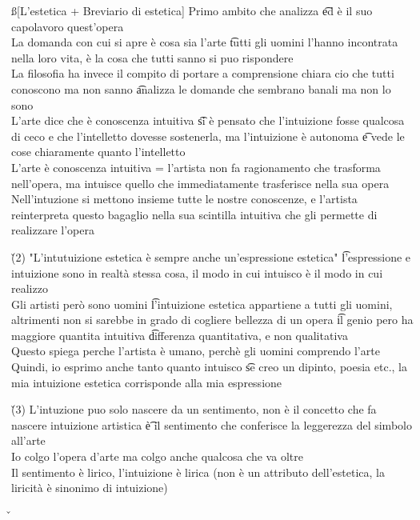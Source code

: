 \documentclass[12pt]{article}
\begin{document}
\ss[L'estetica + Breviario di estetica]
Primo ambito che analizza \t ed è il suo capolavoro quest'opera \\
La domanda con cui si apre è cosa sia l'arte \t tutti gli uomini l'hanno incontrata nella loro vita, è la cosa che tutti sanno si puo rispondere \\
La filosofia ha invece il compito di portare a comprensione chiara cio che tutti conoscono ma non sanno \t analizza le domande che sembrano banali ma non lo sono \\
L'arte dice che è conoscenza intuitiva \t si è pensato che l'intuizione fosse qualcosa di ceco e che l'intelletto dovesse sostenerla, ma l'intuizione è autonoma \t e vede le cose chiaramente quanto l'intelletto \\
L'arte è conoscenza intuitiva = l'artista non fa ragionamento che trasforma nell'opera, ma intuisce quello che immediatamente trasferisce nella sua opera \\
Nell'intuzione si mettono insieme tutte le nostre conoscenze, e l'artista reinterpreta questo bagaglio nella sua scintilla intuitiva che gli permette di realizzare l'opera

\v

(2) "L'intutuizione estetica è sempre anche un'espressione estetica" \t l'espressione e intuizione sono in realtà stessa cosa, il modo in cui intuisco è il modo in cui realizzo \\
Gli artisti però sono uomini \t l'intuizione estetica appartiene a tutti gli uomini, altrimenti non si sarebbe in grado di cogliere bellezza di un opera \t il genio pero ha maggiore quantita intuitiva \t differenza quantitativa, e non qualitativa \\
Questo spiega perche l'artista è umano, perchè gli uomini comprendo l'arte \\
Quindi, io esprimo anche tanto quanto intuisco \t se creo un dipinto, poesia etc., la mia intuizione estetica corrisponde alla mia espressione

\v

(3) L'intuzione puo solo nascere da un sentimento, non è il concetto che fa nascere intuizione artistica \t è il sentimento che conferisce la leggerezza del simbolo all'arte \\
Io colgo l'opera d'arte ma colgo anche qualcosa che va oltre \\
Il sentimento è lirico, l'intuizione è lirica (non è un attributo dell'estetica, la liricità è sinonimo di intuizione)

\v
\end{document}
